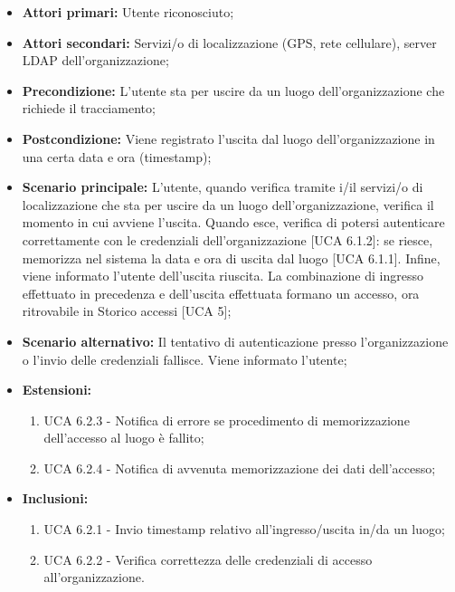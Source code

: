 \begin{itemize}
	\item \textbf{Attori primari:} Utente riconosciuto;
	\item \textbf{Attori secondari:} Servizi/o di localizzazione (GPS, rete cellulare), server LDAP dell'organizzazione;
	\item \textbf{Precondizione:} L'utente sta per uscire da un luogo dell'organizzazione che richiede il tracciamento;
	\item \textbf{Postcondizione:} Viene registrato l'uscita dal luogo dell'organizzazione in una certa data e ora (timestamp);
	\item \textbf{Scenario principale:} L'utente, quando verifica tramite i/il servizi/o di localizzazione che sta per uscire da un luogo dell'organizzazione, verifica il momento in cui avviene l'uscita. Quando esce, verifica di potersi autenticare correttamente con le credenziali dell'organizzazione [UCA 6.1.2]: se riesce, memorizza nel sistema la data e ora di uscita dal luogo [UCA 6.1.1]. Infine, viene informato l'utente dell'uscita riuscita. La combinazione di ingresso effettuato in precedenza e dell'uscita effettuata formano un accesso, ora ritrovabile in Storico accessi [UCA 5];
	\item \textbf{Scenario alternativo:} Il tentativo di autenticazione presso l'organizzazione o l'invio delle credenziali fallisce. Viene informato l'utente;
	\item \textbf{Estensioni:}
	\begin{enumerate}
		\item UCA 6.2.3 - Notifica di errore se procedimento di memorizzazione dell'accesso al luogo è fallito;
		\item UCA 6.2.4 - Notifica di avvenuta memorizzazione dei dati dell'accesso;
	\end{enumerate}
	\item \textbf{Inclusioni:}
	\begin{enumerate}
		\item UCA 6.2.1 - Invio timestamp relativo all'ingresso/uscita in/da un luogo;
		\item UCA 6.2.2 - Verifica correttezza delle credenziali di accesso all'organizzazione.
	\end{enumerate}
\end{itemize}

